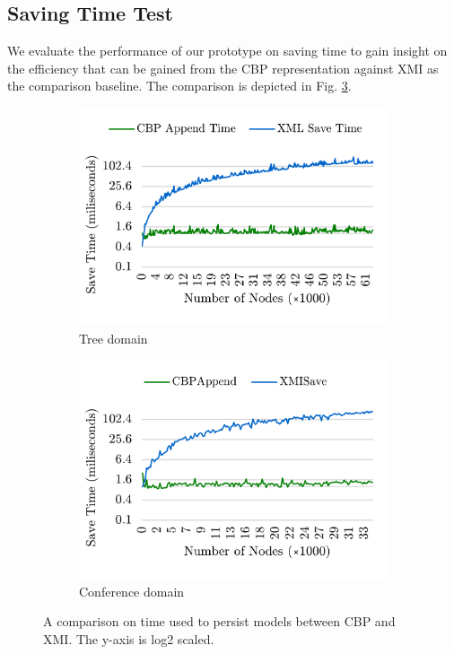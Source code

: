 \documentclass{llncs}
\begin{document}
\subsection{Saving Time Test}
\label{subsec:saving_time_test}
We evaluate the performance of our prototype on saving time to gain insight on the efficiency that can be gained from the CBP representation against XMI as the comparison baseline. The  comparison is depicted in Fig. \ref{fig:append_speed}.

\begin{figure}	
	\begin{subfigure}[t]{0.5\linewidth}
		\includegraphics[width=\linewidth]{append_speed_tree}
		\caption{Tree domain}\label{fig:append_speed_tree}		
	\end{subfigure}
	\hfill
	\begin{subfigure}[t]{0.5\linewidth}
		\includegraphics[width=\linewidth]{append_speed_conf}
		\caption{Conference domain}\label{fig:append_speed_conference}
	\end{subfigure}
	\caption{A comparison on time used to persist models between CBP and XMI. The y-axis is log\textsc{2} scaled.}
	\label{fig:append_speed}
\end{figure}
\end{document}
